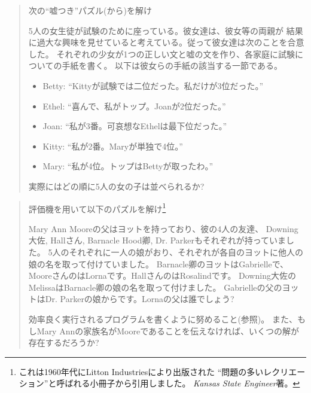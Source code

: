 \begin{quote}
次の``嘘つき''パズル(から)を解け

5人の女生徒が試験のために座っている。彼女達は、彼女等の両親が
結果に過大な興味を見せていると考えている。従って彼女達は次のことを合意した。
それぞれの少女が1つの正しい文と嘘の文を作り、各家庭に試験についての手紙を書く。
以下は彼女らの手紙の該当する一節である。

\begin{itemize}

\item
Betty: ``Kittyが試験では二位だった。私だけが3位だった。''

\item
Ethel: ``喜んで、私がトップ。Joanが2位だった。''

\item
Joan: ``私が3番。可哀想なEthelは最下位だった。''

\item
Kitty: ``私が2番。Maryが単独で4位。''

\item
Mary: ``私が4位。トップはBettyが取ったわ。''

\end{itemize}

実際にはどの順に5人の女の子は並べられるか?
\end{quote}

\begin{quote}
評価機を用いて以下のパズルを解け\footnote{これは1960年代にLitton Industriesにより出版された
``問題の多いレクリエーション''と呼ばれる小冊子から引用しました。
\textit{Kansas State Engineer}著。}

Mary Ann Mooreの父はヨットを持っており、彼の4人の友達、
Downing大佐, Hallさん, Barnacle Hood卿, Dr. Parkerもそれぞれが持っていました。
5人のそれぞれに一人の娘がおり、それぞれが各自のヨットに他人の娘の名を取って付けていました。
Barnacle卿のヨットはGabrielleで、MooreさんのはLornaです。HallさんのはRosalindです。
Downing大佐のMelissaはBarnacle卿の娘の名を取って付けました。
Gabrielleの父のヨットはDr. Parkerの娘からです。Lornaの父は誰でしょう?

効率良く実行されるプログラムを書くように努めること(参照)。
また、もしMary Annの家族名がMooreであることを伝えなければ、いくつの解が存在するだろうか?
\end{quote}

